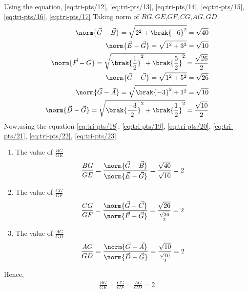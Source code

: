 \documentclass[journal,12pt,twocolumn]{IEEEtran}
\theoremstyle{remark}
\begin{document}
Using the equation,
 		\eqref{eq:tri-pts/12},
		\eqref{eq:tri-pts/13},
		\eqref{eq:tri-pts/14},
		\eqref{eq:tri-pts/15},
		\eqref{eq:tri-pts/16},
		\eqref{eq:tri-pts/17}
Taking norm of $BG,GE$,$GF,CG$,$AG,GD$ 
\begin{align}
		\label{eq:tri-pts/18} \norm{\vec{G}-\vec{B}} = \sqrt{2^2 + \brak{-6}^{2}} = \sqrt{40} \\
		\label{eq:tri-pts/19} \norm{\vec{E}-\vec{G}} = \sqrt{1^2 + 3^2} = \sqrt{10} \\
		\label{eq:tri-pts/20} \norm{\vec{F}-\vec{G}} = \sqrt{\brak{\frac{1}{2}}^{2} + \brak{\frac{5}{2}}^{2}} = \frac{\sqrt{26}}{2} \\  
		\label{eq:tri-pts/21} \norm{\vec{G}-\vec{C}} = \sqrt{1^2 + 5^2} = \sqrt{26} \\
		\label{eq:tri-pts/22} \norm{\vec{G}-\vec{A}} = \sqrt{\brak{-3}^{2}+1^2} = \sqrt{10} \\
		\label{eq:tri-pts/23} \norm{\vec{D}-\vec{G}} = \sqrt{\brak{\frac{-3}{2}}^{2}+\brak{\frac{1}{2}}^{2}} = \frac{\sqrt{10}}{2}  
\end{align}
Now,using the equation
		\eqref{eq:tri-pts/18},
		\eqref{eq:tri-pts/19},
		\eqref{eq:tri-pts/20},
		\eqref{eq:tri-pts/21},
		\eqref{eq:tri-pts/22},
		\eqref{eq:tri-pts/23}
\begin{enumerate}
\item The value of $\frac{BG}{GE}$
\begin{align}
		\frac{BG}{GE} = \frac{\norm{\vec{G}-\vec{B}}}{\norm{\vec{E}-\vec{G}}} = \frac{\sqrt{40}}{\sqrt{10}} = 2 
\end{align}
\item The value of $\frac{CG}{GF}$
\begin{align} 
		\frac{CG}{GF} = \frac{\norm{\vec{G}-\vec{C}}}{\norm{\vec{F}-\vec{G}}} = \frac{\sqrt{26}}{\frac{\sqrt{26}}{2}} = 2 
\end{align}
\item The value of $\frac{AG}{GD}$
\begin{align}
		\frac{AG}{GD} = \frac{\norm{\vec{G}-\vec{A}}}{\norm{\vec{D}-\vec{G}}} = \frac{\sqrt{10}}{\frac{\sqrt{10}}{2}} = 2 
\end{align}
\end{enumerate}
Hence,
\begin{align}
		\frac{BG}{GE} = 
		\frac{CG}{GF} =
		\frac{AG}{GD} = 2
\end{align}
\end{document}
